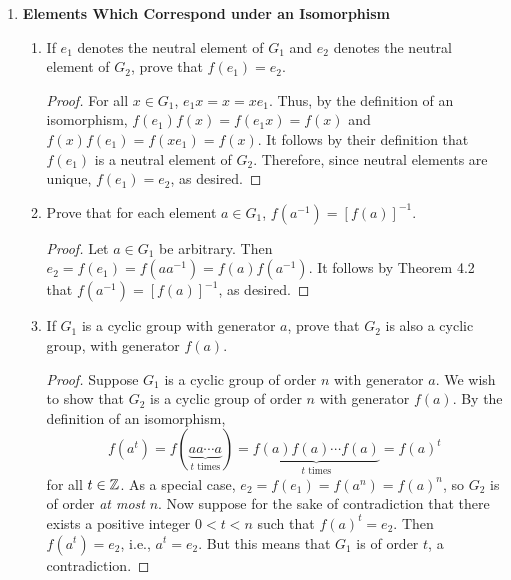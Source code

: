 \documentclass[../notes.tex]{subfiles}
\begin{document}
\begin{enumerate}[label={\textbf{\Alph*.}}]
\begin{enumerate}
\begin{proof}
\begin{equation*}
                = g(f(a)f(b))
                = g(f(a))g(f(b))
                = (g\circ f)(a)(g\circ f)(b)
            \end{equation*}
            as desired.
        \end{proof}
    \end{enumerate}
    \item \textbf{Elements Which Correspond under an Isomorphism}
    \begin{enumerate}
        \item If $e_1$ denotes the neutral element of $G_1$ and $e_2$ denotes the neutral element of $G_2$, prove that $f(e_1)=e_2$.
        \begin{proof}
            For all $x\in G_1$, $e_1x=x=xe_1$. Thus, by the definition of an isomorphism, $f(e_1)f(x)=f(e_1x)=f(x)$ and $f(x)f(e_1)=f(xe_1)=f(x)$. It follows by their definition that $f(e_1)$ is a neutral element of $G_2$. Therefore, since neutral elements are unique, $f(e_1)=e_2$, as desired.
        \end{proof}
        \item Prove that for each element $a\in G_1$, $f(a^{-1})=[f(a)]^{-1}$.
        \begin{proof}
            Let $a\in G_1$ be arbitrary. Then $e_2=f(e_1)=f(aa^{-1})=f(a)f(a^{-1})$. It follows by Theorem 4.2 that $f(a^{-1})=[f(a)]^{-1}$, as desired.
        \end{proof}
        \item If $G_1$ is a cyclic group with generator $a$, prove that $G_2$ is also a cyclic group, with generator $f(a)$.
        \begin{proof}
            Suppose $G_1$ is a cyclic group of order $n$ with generator $a$. We wish to show that $G_2$ is a cyclic group of order $n$ with generator $f(a)$. By the definition of an isomorphism,
            \begin{equation*}
                f(a^t) = f(\underbrace{aa\cdots a}_{t\text{ times}})
                = \underbrace{f(a)f(a)\cdots f(a)}_{t\text{ times}}
                = f(a)^t
            \end{equation*}
            for all $t\in\mathbb{Z}$. As a special case, $e_2=f(e_1)=f(a^n)=f(a)^n$, so $G_2$ is of order \emph{at most} $n$. Now suppose for the sake of contradiction that there exists a positive integer $0<t<n$ such that $f(a)^t=e_2$. Then $f(a^t)=e_2$, i.e., $a^t=e_2$. But this means that $G_1$ is of order $t$, a contradiction.
        \end{proof}
    \end{enumerate}

\end{enumerate}
\end{document}
